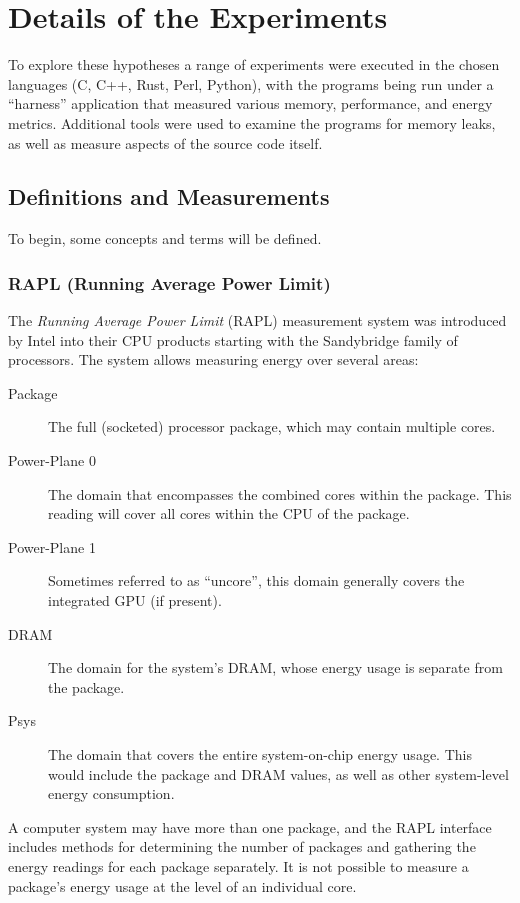 \section{Details of the Experiments}
\label{sec:experiments}

To explore these hypotheses a range of experiments were executed in the chosen languages (C, C++, Rust, Perl, Python), with the programs being run under a ``harness'' application that measured various memory, performance, and energy metrics. Additional tools were used to examine the programs for memory leaks, as well as measure aspects of the source code itself.

\subsection{Definitions and Measurements}

To begin, some concepts and terms will be defined.

\subsubsection{RAPL (Running Average Power Limit)}

The \textit{Running Average Power Limit} (RAPL) measurement system was introduced by Intel into their CPU products starting with the Sandybridge family of processors. The system allows measuring energy over several areas:

\begin{description}
\item[Package] The full (socketed) processor package, which may contain multiple cores.
\item[Power-Plane 0] The domain that encompasses the combined cores within the package. This reading will cover all cores within the CPU of the package.
\item[Power-Plane 1] Sometimes referred to as ``uncore'', this domain generally covers the integrated GPU (if present).
\item[DRAM] The domain for the system's DRAM, whose energy usage is separate from the package.
\item[Psys] The domain that covers the entire system-on-chip energy usage. This would include the package and DRAM values, as well as other system-level energy consumption.
\end{description}

A computer system may have more than one package, and the RAPL interface includes methods for determining the number of packages and gathering the energy readings for each package separately. It is not possible to measure a package's energy usage at the level of an individual core.

